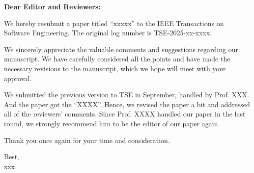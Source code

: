 \begin{letter}
\textbf{Dear Editor and Reviewers:}

We hereby resubmit a paper titled “xxxxx” to the IEEE Transactions on Software Engineering.
The original log number is TSE-2025-xx-xxxx.

We sincerely appreciate the valuable comments and suggestions regarding our manuscript. 
We have carefully considered all the points and have made the necessary revisions to the manuscript, which we hope will meet with your approval.

We submitted the previous version to TSE in September, handled by Prof. XXX.
And the paper got the “XXXX”. 
Hence, we revised the paper a bit and addressed all of the reviewers’ comments. 
Since Prof. XXXX handled our paper in the last round, we strongly recommend him to be the editor of our paper again.

Thank you once again for your time and consideration.

Best, \\
xxx

\end{letter}

\separator
